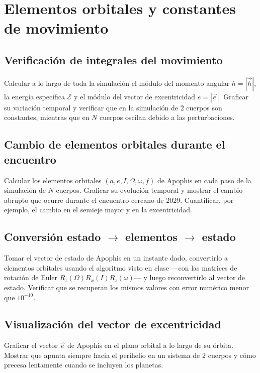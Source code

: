 \section{Elementos orbitales y constantes de movimiento}

\subsection{Verificación de integrales del movimiento}

Calcular a lo largo de toda la simulación el módulo del momento angular $h = |\vec{h}|$, la energía específica $\mathcal{E}$ y el módulo del vector de excentricidad $e = |\vec{e}|$. Graficar su variación temporal y verificar que en la simulación de 2 cuerpos son constantes, mientras que en $N$ cuerpos oscilan debido a las perturbaciones.

\subsection{Cambio de elementos orbitales durante el encuentro}

Calcular los elementos orbitales $(a, e, I, \Omega, \omega, f)$ de Apophis en cada paso de la simulación de $N$ cuerpos. Graficar su evolución temporal y mostrar el cambio abrupto que ocurre durante el encuentro cercano de 2029. Cuantificar, por ejemplo, el cambio en el semieje mayor y en la excentricidad.

\subsection{\texorpdfstring{Conversión estado $\rightarrow$ elementos $\rightarrow$ estado}{Conversión estado a elementos a estado}}

Tomar el vector de estado de Apophis en un instante dado, convertirlo a elementos orbitales usando el algoritmo visto en clase ---con las matrices de rotación de Euler $R_z(\Omega) R_x(I) R_z(\omega)$--- y luego reconvertirlo al vector de estado. Verificar que se recuperan los mismos valores con error numérico menor que $10^{-10}$.

\subsection{Visualización del vector de excentricidad}

Graficar el vector $\vec{e}$ de Apophis en el plano orbital a lo largo de su órbita. Mostrar que apunta siempre hacia el perihelio en un sistema de 2 cuerpos y cómo precesa lentamente cuando se incluyen los planetas.